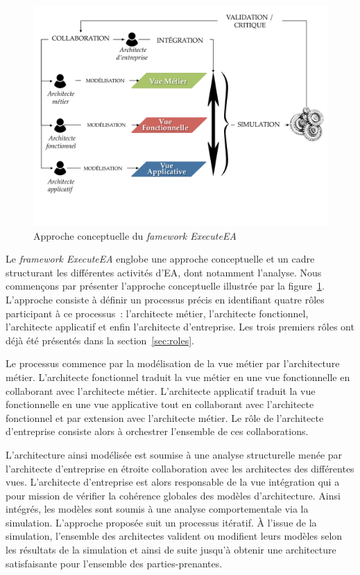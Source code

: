 \begin{figure}[!ht]
 \begin{center}
 \includegraphics[trim= 0cm 2.5cm 0cm 0cm, width=1\textwidth]{figures/4_demarche/approche_conceptuelle.pdf} \end{center}
 \caption{Approche conceptuelle du \protect\emph{famework ExecuteEA}}
 \label{fig:approche_conceptuelle}
\end{figure}

Le \emph{framework ExecuteEA} englobe une approche conceptuelle et un cadre structurant les différentes activités d'EA, dont
notamment  l'analyse. Nous commençons par présenter l'approche conceptuelle illustrée par la figure~\ref{fig:approche_conceptuelle}.
L'approche consiste à définir un processus précis en identifiant
quatre rôles participant à ce processus~: l'architecte métier,
l'architecte fonctionnel, l'architecte applicatif et enfin l'architecte d'entreprise. Les trois premiers rôles ont déjà été présentés
dans la section~\ref{sec:roles}. 



Le processus commence par la modélisation de la vue métier par l'architecture
métier. L'architecte fonctionnel traduit la vue métier en une vue fonctionnelle 
en collaborant avec l'architecte
métier. L'architecte applicatif traduit la vue fonctionnelle en une vue applicative
tout en collaborant avec l'architecte fonctionnel et par extension avec l'architecte
métier. Le rôle de l'architecte d'entreprise consiste alors à orchestrer l'ensemble de ces
collaborations.

L'architecture ainsi modélisée est soumise à une analyse
structurelle menée par l'architecte d'entreprise en étroite collaboration avec
les architectes des différentes vues. L'architecte d'entreprise est alors
responsable de la vue intégration qui a pour mission de vérifier la cohérence
globales des modèles d'architecture. Ainsi intégrés, les modèles sont soumis à
une analyse comportementale via la simulation.
L'approche proposée suit un processus itératif. À l'issue de la simulation, l'ensemble des
architectes valident ou modifient leurs modèles selon les résultats de la simulation et ainsi de
suite jusqu'à obtenir une architecture satisfaisante pour l'ensemble des parties-prenantes.

